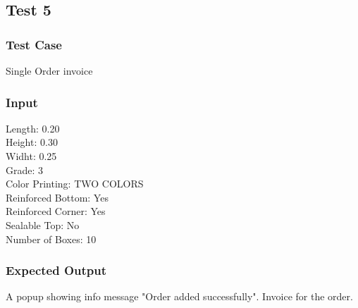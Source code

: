 \documentclass[12pt]{article}
\begin{document}
\subsection{Test 5}
\subsubsection{Test Case}
Single Order invoice
\subsubsection{Input}
Length: 0.20\\
Height: 0.30\\
Widht: 0.25\\
Grade: 3\\
Color Printing: TWO COLORS\\
Reinforced Bottom: Yes\\
Reinforced Corner: Yes\\
Sealable Top: No\\
Number of Boxes: 10\\
\subsubsection{Expected Output}
A popup showing info message "Order added successfully".
Invoice for the order.
\end{document}
